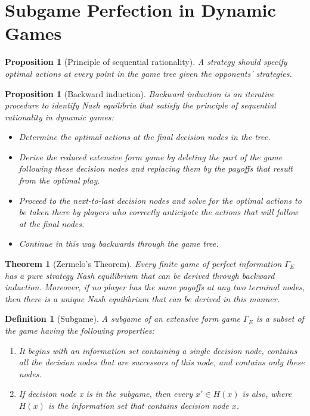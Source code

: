 \documentclass[12pt]{extreport} %
\theoremstyle{named}
\theoremstyle{itshape}
\newtheorem{theorem}[unnamedtheorem]{Theorem}
\newtheorem*{definition}{Definition}
\theoremstyle{normal}
\newtheorem{proposition}[unnamedtheorem]{Proposition}
\begin{document}
\section{Subgame Perfection in Dynamic Games}

\begin{proposition}[Principle of sequential rationality]
	A strategy should specify optimal actions at every point in the game tree given the opponents’ strategies.
\end{proposition}

\begin{proposition}[Backward induction]
	Backward induction is an iterative procedure to identify Nash equilibria that satisfy the principle of sequential rationality in dynamic games:
	\begin{itemize}
		\item Determine the optimal actions at the final decision nodes in the tree.
		\item Derive the reduced extensive form game by deleting the part of the game following these decision nodes and replacing them by the payoffs that result from the optimal play.
		\item Proceed to the next-to-last decision nodes and solve for the optimal actions to be taken there by players who correctly anticipate the actions that will follow at the final nodes.
		\item Continue in this way backwards through the game tree.
	\end{itemize}
\end{proposition}

\begin{theorem}[Zermelo’s Theorem]
Every finite game of perfect information $\Gamma_E$ has a pure strategy Nash equilibrium that can be derived through backward induction. Moreover, if no player has the same payoffs at any two terminal nodes, then there is a unique Nash equilibrium that can be derived in this manner.
\end{theorem}

\begin{definition}[Subgame]
	A subgame of an extensive form game $\Gamma_E$ is a subset of the game having the following properties:
	\begin{enumerate}
		\item It begins with an information set containing a single decision node, contains all the decision nodes that are successors of this node, and contains only these nodes.
		\item If decision node x is in the subgame, then every $x' \in H(x)$ is also, where $H(x)$ is the information set that contains decision node $x$.
	\end{enumerate}
\end{definition} 
\end{document}
